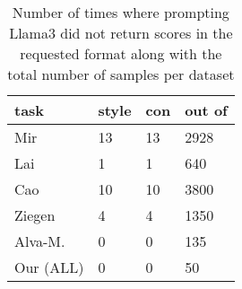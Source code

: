 \begin{table}%
\centering 
\begin{tabular}{@{}llll@{}}
\toprule
\textbf{task} & \textbf{style} & \textbf{con} & \textbf{out of} \\ \midrule
Mir & 13 & 13 & 2928 \\
Lai & 1 & 1 & 640 \\
Cao & 10 & 10 & 3800 \\
Ziegen & 4 & 4 & 1350 \\
Alva-M. & 0 & 0 & 135 \\
Our (ALL) & 0 & 0 & 50 \\ \bottomrule
\end{tabular}
\caption{Number of times where prompting Llama3 did not return scores in the requested format along with the total number of samples per dataset}
\label{tab:fail}
\end{table}



